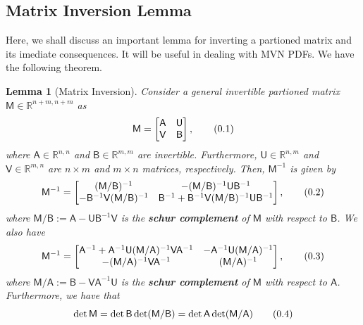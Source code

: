 \documentclass[10pt]{article}
\newtheorem{lem}[thm]{Lemma}
\theoremstyle{definition}
\newcommand\eqnum{\addtocounter{equation}{1}\tag{\arabic{section}.\arabic{equation}}}
\begin{document}
\subsection{Matrix Inversion Lemma}
Here, we shall discuss an important lemma for inverting a partioned matrix and its imediate consequences. It will be useful in dealing with MVN PDFs. We have the following theorem.
\begin{lem}[Matrix Inversion]\label{lem:MIL}
Consider a general invertible partioned matrix $\mathsf{M}\in\mathbb{R}^{n+m,n+m}$ as
\begin{equation*}
\mathsf{M} =
\begin{bmatrix}
\mathsf{A} & \mathsf{U} \\
\mathsf{V} & \mathsf{B}
\end{bmatrix},
\eqnum
\end{equation*}
where $\mathsf{A}\in\mathbb{R}^{n,n}$ and $\mathsf{B}\in\mathbb{R}^{m,m}$ are invertible. Furthermore, $\mathsf{U}\in\mathbb{R}^{n,m}$ and $\mathsf{V}\in\mathbb{R}^{m,n}$ are $n \times m$ and $m\times n$ matrices, respectively. Then, $\mathsf{M}^{-1}$ is given by
\begin{equation*}
\mathsf{M}^{-1} =
\begin{bmatrix}
(\mathsf{M}/\mathsf{B})^{-1} & 
-(\mathsf{M}/\mathsf{B})^{-1}\mathsf{U}\mathsf{B}^{-1} \\
-\mathsf{B}^{-1}\mathsf{V}(\mathsf{M}/\mathsf{B})^{-1} & 
\mathsf{B}^{-1}+\mathsf{B}^{-1}\mathsf{V}(\mathsf{M}/\mathsf{B})^{-1}\mathsf{U}\mathsf{B}^{-1}
\end{bmatrix},
\eqnum
\label{eq:schur:MB}
\end{equation*}
where $\mathsf{M}/\mathsf{B}:=\mathsf{A}-\mathsf{U}\mathsf{B}^{-1}\mathsf{V}$ is the \textbf{schur complement} of $\mathsf{M}$ with respect to $\mathsf{B}$. We also have
\begin{equation*}
\mathsf{M}^{-1} =
\begin{bmatrix}
\mathsf{A}^{-1}+\mathsf{A}^{-1}\mathsf{U}(\mathsf{M}/\mathsf{A})^{-1}\mathsf{V}\mathsf{A}^{-1} & 
-\mathsf{A}^{-1}\mathsf{U} (\mathsf{M}/\mathsf{A})^{-1} \\
-(\mathsf{M}/\mathsf{A})^{-1}\mathsf{V}\mathsf{A}^{-1} & 
(\mathsf{M}/\mathsf{A})^{-1} 
\end{bmatrix},
\eqnum
\label{eq:schur:MA}
\end{equation*}
where $\mathsf{M}/\mathsf{A}:=\mathsf{B}-\mathsf{V}\mathsf{A}^{-1}\mathsf{U}$ is the \textbf{schur complement} of $\mathsf{M}$ with respect to $\mathsf{A}$. Furthermore, we have that
\begin{equation*}
\det\mathsf{M} = \det\mathsf{B}\det(\mathsf{M}/\mathsf{B})= \det\mathsf{A}\det(\mathsf{M}/\mathsf{A})
\eqnum
\label{eq:schur:det}
\end{equation*}
\end{lem}
\end{document}
